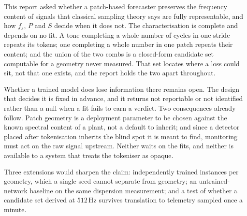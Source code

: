 This report asked whether a patch-based forecaster preserves the frequency content of signals that classical sampling theory says are fully representable, and how $f_s$, $P$ and $S$ decide when it does not. The characterisation is complete and depends on no fit. A tone completing a whole number of cycles in one stride repeats its tokens; one completing a whole number in one patch repeats their content; and the union of the two combs is a closed-form candidate set computable for a geometry never measured. That set locates where a loss could sit, not that one exists, and the report holds the two apart throughout.

Whether a trained model does lose information there remains open. The design that decides it is fixed in advance, and it returns not reportable or not identified rather than a null when a fit fails to earn a verdict. Two consequences already follow. Patch geometry is a deployment parameter to be chosen against the known spectral content of a plant, not a default to inherit; and since a detector placed after tokenisation inherits the blind spot it is meant to find, monitoring must act on the raw signal upstream. Neither waits on the fits, and neither is available to a system that treats the tokeniser as opaque.

Three extensions would sharpen the claim: independently trained instances per geometry, which a single seed cannot separate from geometry; an untrained-network baseline on the same dispersion measurement; and a test of whether a candidate set derived at $512$\,Hz survives translation to telemetry sampled once a minute.
